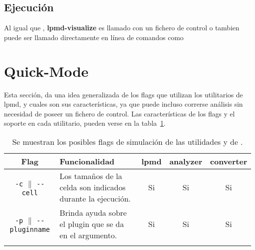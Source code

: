 \subsection{Ejecuci\'on}

Al igual que {\lpmd}, \textbf{lpmd-visualize} es llamado con un fichero de control o tambien puede ser llamado directamente en l\'inea de comandos como

%

\section{Quick-Mode}
\label{chap:util-quickmode}

Esta secci\'on, da una idea generalizada de los flags que utilizan los utilitarios de lpmd, y cuales son sus caracter\'isticas, ya que puede incluso correrse an\'alisis sin necesidad de poseer un fichero de control. Las caracter\'isticas de los flags y el soporte en cada utilitario, pueden verse en la tabla~\ref{tab:quickmode}.

\begin{table}[h!]
 \centering
 \begin{tabular}{cp{5cm}ccc}\\
 \hline\hline
  Flag & Funcionalidad & lpmd & analyzer & converter \\
 \hline\hline
\verb|-c| $\parallel$ \verb|--cell|&Los tama\~nos de la celda son indicados durante la ejecuci\'on.&Si&Si&Si\\\hline
\verb|-p| $\parallel$ \verb|--pluginname|&Brinda ayuda sobre el plugin que se da en el argumento.&Si&Si&Si\\\hline
 &&&&\\\hline
 \end{tabular}
 \label{tab:quickmode}
 \caption{Se muestran los posibles flags de simulaci\'on de las utilidades y de {\lpmd}.}
\end{table}
